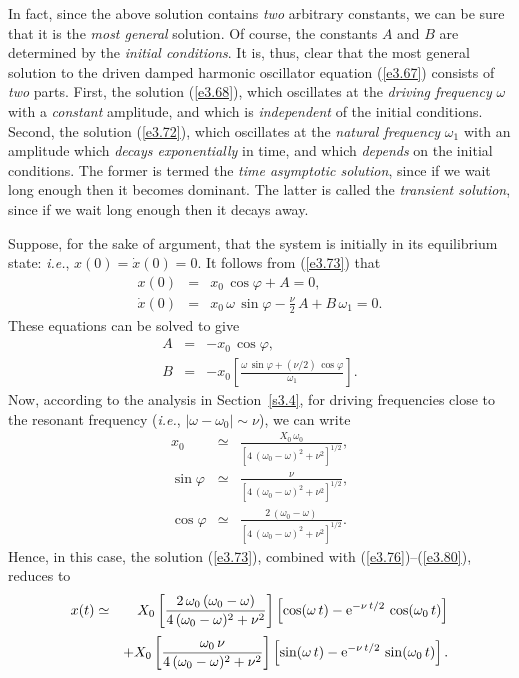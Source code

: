 In fact, since the above solution contains {\em two}\/ arbitrary constants, we can be sure
that it is the {\em most general}\/ solution. Of course, the constants $A$ and $B$
are determined by the {\em initial conditions}. It is, thus,  clear that the
most general solution to the driven damped harmonic oscillator equation (\ref{e3.67})
consists of {\em two}\/ parts. First, the  solution (\ref{e3.68}), which oscillates at the {\em driving  frequency}\/ $\omega$ with a {\em constant}\/ amplitude, and which is {\em independent}\/ of the initial conditions. Second, the
solution (\ref{e3.72}), which oscillates at the {\em natural frequency}\/ $\omega_1$ with an amplitude which {\em decays exponentially}\/ in time, and
which {\em depends}\/ on the initial conditions. The former  is termed the
{\em time asymptotic solution}, since if we wait long enough then it
becomes dominant. The latter  is called the {\em transient solution}, since if
we wait long enough then it decays away.

Suppose, for the sake of argument, that the system is initially in its equilibrium
state: {\em i.e.}, $x(0)=\dot{x}(0)=0$. It follows from (\ref{e3.73}) that
\begin{eqnarray}
x(0)&=& x_0\,\cos\varphi  +A=0,\\[0.5ex]
\dot{x}(0)&=& x_0\,\omega\,\sin\varphi - \frac{\nu}{2}\,A+B\,\omega_1=0.
\end{eqnarray}
These equations can be solved to give
\begin{eqnarray}\label{e3.76}
A &=& -x_0\,\cos\varphi,\\[0.5ex]
B &=& -x_0\left[\frac{\omega\,\sin\varphi + (\nu/2)\,\cos\varphi}{\omega_1}\right].\label{e3.77}
\end{eqnarray}
Now, according to the analysis in Section~\ref{s3.4}, for driving frequencies
close to the resonant frequency ({\em i.e.}, $|\omega-\omega_0|\sim \nu$), we
can write
\begin{eqnarray}
x_0 &\simeq& \frac{X_0\,\omega_0}{[4\,(\omega_0-\omega)^2+\nu^2]^{1/2}},\\[0.5ex]
\sin\varphi &\simeq& \frac{\nu}{[4\,(\omega_0-\omega)^2+\nu^2]^{1/2}},\\[0.5ex]
\cos\varphi &\simeq& \frac{2\,(\omega_0-\omega)}{[4\,(\omega_0-\omega)^2+\nu^2]^{1/2}}.\label{e3.80}
\end{eqnarray}
Hence, in this case, the solution (\ref{e3.73}), combined with (\ref{e3.76})--(\ref{e3.80}),  reduces to
\begin{eqnarray}\label{e3.81}
x(t) &\simeq& X_0\left[\frac{2\,\omega_0\,(\omega_0-\omega)}{4\,(\omega_0-\omega)^2+\nu^2}\right]\left[\cos(\omega\,t)-{\rm e}^{-\nu\,t/2}\,\cos(\omega_0\,t)\right]\nonumber\\[0.5ex]
&&+ X_0\left[\frac{\omega_0\,\nu}{4\,(\omega_0-\omega)^2+\nu^2}\right]\left[\sin(\omega\,t)-{\rm e}^{-\nu\,t/2}\,\sin(\omega_0\,t)\right].
\end{eqnarray}

